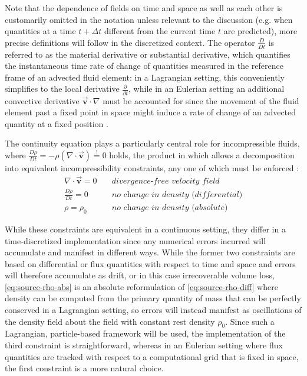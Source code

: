 \documentclass[conference]{IEEEtran}
\newcommand\vek[1]{\vec{\bm{#1}}}
\newcommand\br[1]{\left(#1\right)}
\newcommand\divergence{{\nabla\cdot}}
\begin{document}
Note that the dependence of fields on time and space as well as each other is customarily omitted in the notation unless relevant to the discussion (e.g. when quantities at a time $t+\Delta t$ different from the current time $t$ are predicted), more precise definitions will follow in the discretized context. The operator $\frac{D}{Dt}$ is referred to as the material derivative or substantial derivative, which quantifies the instantaneous time rate of change of quantities measured in the reference frame of an advected fluid element: in a Lagrangian setting, this conveniently simplifies to the local derivative $\frac{\partial}{\partial t}$, while in an Eulerian setting an additional convective derivative $\vek{v} \cdot \nabla$ must be accounted for since the movement of the fluid element past a fixed point in space might induce a rate of change of an advected quantity at a fixed position \cite{anderson}. 

The continuity equation plays a particularly central role for incompressible fluids, where $\frac{D \rho}{D t} = -\rho\br{\divergence \vek{v}}\overset{!}{=} 0$ holds, the product in which allows a decomposition into equivalent incompressibility constraints, any one of which must be enforced \cite{survey2022}:
\begin{align}
    \divergence \vek{v} = 0 & \quad\textit{divergence-free velocity field}\label{eq:source-div-free}\\
    \frac{D \rho}{D t} = 0  & \quad\textit{no change in density (differential)}\label{eq:source-rho-diff}\\
    \rho = \rho_0           &\quad \textit{no change in density (absolute)}\label{eq:source-rho-abs}
\end{align}

While these constraints are equivalent in a continuous setting, they differ in a time-discretized implementation since any numerical errors incurred will accumulate and manifest in different ways. While the former two constraints are based on differential or flux quantities with respect to time and space and errors will therefore accumulate as drift, or in this case irrecoverable volume loss, \autoref{eq:source-rho-abs} is an absolute reformulation of \autoref{eq:source-rho-diff} where density can be computed from the primary quantity of mass that can be perfectly conserved in a Lagrangian setting, so errors will instead manifest as oscillations of the density field about the field with constant rest density $\rho_0$. Since such a Lagrangian, particle-based framework will be used, the implementation of the third constraint is straightforward, whereas in an Eulerian setting where flux quantities are tracked with respect to a computational grid that is fixed in space, the first constraint is a more natural choice. 
\end{document}
